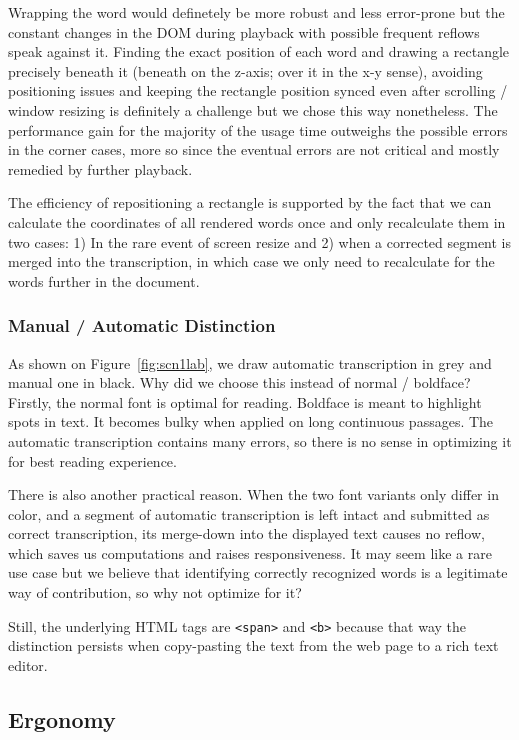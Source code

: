 \documentclass{svproc}
\begin{document}
Wrapping the word would definetely be more robust and less error-prone but the
constant changes in the DOM during playback with possible frequent reflows speak
against it. Finding the exact position of each word and drawing a rectangle
precisely beneath it (beneath on the z-axis; over it in the x-y sense), avoiding
positioning issues and keeping the rectangle position synced even after scrolling
/ window resizing is definitely a challenge but we chose this way nonetheless.
The performance gain for the majority of the usage time outweighs the possible
errors in the corner cases, more so since the eventual errors are not critical
and mostly remedied by further playback.

The efficiency of repositioning a rectangle is supported by the fact that we can
calculate the coordinates of all rendered words once and only recalculate them
in two cases: 1) In the rare event of screen resize and 2) when a corrected
segment is merged into the transcription, in which case we only need to
recalculate for the words further in the document.

\subsubsection{Manual / Automatic Distinction}

As shown on Figure~\ref{fig:scn1lab}, we draw automatic transcription in grey
and manual one in black. Why did we choose this instead of normal / boldface?
Firstly, the normal font is optimal for reading. Boldface is meant to highlight
spots in text. It becomes bulky when applied on long continuous passages. The
automatic transcription contains many errors, so there is no sense in optimizing
it for best reading experience.

There is also another practical reason. When the two font variants only differ
in color, and a segment of automatic transcription is left intact and submitted
as correct transcription, its merge-down into the displayed text causes no
reflow, which saves us computations and raises responsiveness. It may seem like
a rare use case but we believe that identifying correctly recognized words is a
legitimate way of contribution, so why not optimize for it?

Still, the underlying HTML tags are \texttt{<span>} and \texttt{<b>} because
that way the distinction persists when copy-pasting the text from the web page
to a rich text editor.

\subsection{Ergonomy}
\end{document}
